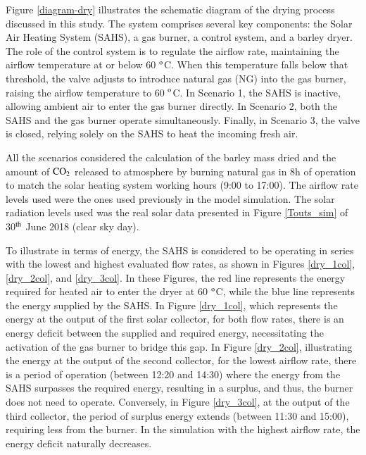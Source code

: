 Figure \ref{diagram-dry} illustrates the schematic diagram of the drying process discussed in this study. The system comprises several key components: the Solar Air Heating System (SAHS), a gas burner, a control system, and a barley dryer. The role of the control system is to regulate the airflow rate, maintaining the airflow temperature at or below 60 $^{\rm{o}}$C. When this temperature falls below that threshold, the valve adjusts to introduce natural gas (NG) into the gas burner, raising the airflow temperature to 60 $^{\rm{o}}$C. In Scenario 1, the SAHS is inactive, allowing ambient air to enter the gas burner directly. In Scenario 2, both the SAHS and the gas burner operate simultaneously. Finally, in Scenario 3, the valve is closed, relying solely on the SAHS to heat the incoming fresh air.


All the scenarios considered the calculation of the barley mass dried and the amount of $\rm{CO_2}$ released to atmosphere by burning natural gas in 8h of operation to match the solar heating system working hours (9:00 to 17:00). The airflow rate levels used were the ones used previously in the model simulation. The solar radiation levels used was the real solar data presented in Figure \ref{Touts_sim} of 30$^{\rm{th}}$ June 2018 (clear sky day).

To illustrate in terms of energy, the SAHS is considered to be operating in series with the lowest and highest evaluated flow rates, as shown in Figures \ref{dry_1col}, \ref{dry_2col}, and \ref{dry_3col}. In these Figures, the red line represents the energy required for heated air to enter the dryer at 60 $^{\rm{o}}$C, while the blue line represents the energy supplied by the SAHS. In Figure \ref{dry_1col}, which represents the energy at the output of the first solar collector, for both flow rates, there is an energy deficit between the supplied and required energy, necessitating the activation of the gas burner to bridge this gap. In Figure \ref{dry_2col}, illustrating the energy at the output of the second collector, for the lowest airflow rate, there is a period of operation (between 12:20 and 14:30) where the energy from the SAHS surpasses the required energy, resulting in a surplus, and thus, the burner does not need to operate. Conversely, in Figure \ref{dry_3col}, at the output of the third collector, the period of surplus energy extends (between 11:30 and 15:00), requiring less from the burner. In the simulation with the highest airflow rate, the energy deficit naturally decreases.

